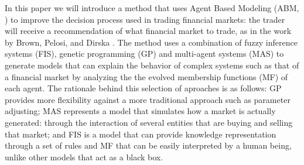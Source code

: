 \documentclass[a4paper,twoside]{article}
\begin{document}
In this paper we will introduce a method that uses Agent Based
Modeling (ABM, \cite{gilbert2008agent}) to improve the
decision process used in trading financial markets: the trader will receive a
recommendation of what financial market to trade, as in the work by
Brown, Pelosi, and Dirska \cite{brown2013dynamic}. The
method uses a combination of fuzzy inference systems (FIS), genetic
programming (GP) \cite{poli2008field} \cite{Koza1992} and multi-agent
systems (MAS) \cite{Shoham2009} to generate models that can explain the
behavior of complex systems such as that of a financial market by
analyzing the the evolved membership functions (MF) of each agent. %
%
%
The rationale behind this selection of aproaches is as follows: GP
provides more flexibility against a more traditional approach such as
parameter adjusting; MAS represents a model that simulates how a
market is actually generated: through the interaction of several entities
that are buying and selling that market; and FIS is a model that can provide
knowledge representation through a set of rules and MF that can be
easily interpreted by a human being, unlike other models that act as a
black box. %

\end{document}
